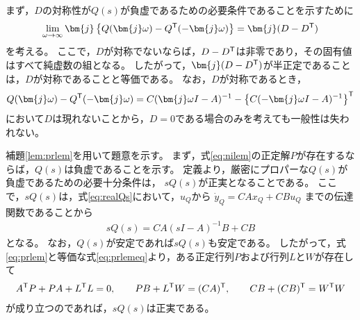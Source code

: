 \documentclass[tombow,dvipdfmx]{corona-a5}
\begin{document}
\begin{証明}
まず，$D$の対称性が$Q(s)$が負虚であるための必要条件であることを示すために
\begin{align*}
\lim_{\omega \rightarrow \infty} 
\bm{j}\left\{Q(\bm{j} \omega) - Q^{\sf T}(-\bm{j} \omega) \right\}
= \bm{j} (D - D^{\sf T})
\end{align*}
を考える。
ここで，$D$が対称でないならば，$D - D^{\sf T}$は非零であり，その固有値はすべて純虚数の組となる。
したがって，$\bm{j} (D - D^{\sf T})$が半正定であることは，$D$が対称であることと等価である。
なお，$D$が対称であるとき，
\begin{align*}
Q(\bm{j} \omega) - Q^{\sf T}(-\bm{j} \omega) = 
C(\bm{j} \omega I -A)^{-1} - \left\{ C( -\bm{j} \omega I -A)^{-1} \right\}^{\sf T}
\end{align*}
において$D$は現れないことから，$D=0$である場合のみを考えても一般性は失われない。

補題\ref{lem:prlem}を用いて題意を示す。
まず，式\ref{eq:nilem}の正定解$P$が存在するならば，$Q(s)$は負虚であることを示す。
定義より，厳密にプロパーな$Q(s)$が負虚であるための必要十分条件は，
$sQ(s)$が正実となることである。
ここで，$sQ(s)$は，式\ref{eq:realQs}において，$u_{Q}$から
$
\dot{y}_Q = CA x_Q + CB u_Q
$
までの伝達関数であることから
\begin{align}\label{eq:sQs}
sQ(s) = CA (sI - A)^{-1}B + CB
\end{align}
となる。
なお，$Q(s)$が安定であれば$sQ(s)$も安定である。
したがって，式\ref{eq:prlem}と等価な式\ref{eq:prlemeq}より，ある正定行列$P$および行列$L$と$W$が存在して
\begin{align}\label{eq:nicLW}
A^{\sf T}P+PA + L^{\sf T} L =0
,\qquad
PB + L^{\sf T} W = (CA)^{\sf T}
,\qquad
CB + (CB)^{\sf T} = W^{\sf T} W
\end{align}
が成り立つのであれば，$sQ(s)$は正実である。


\end{証明}
\end{document}

